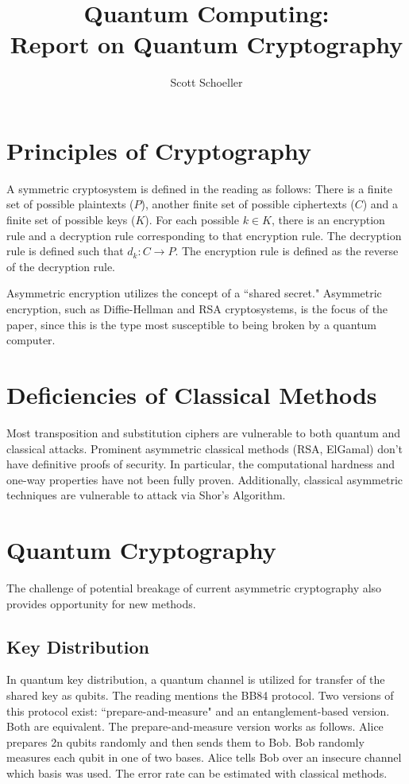 \documentclass[12pt]{article}
\title{Quantum Computing:\\Report on Quantum Cryptography}
\author{Scott Schoeller}
\date{}
\begin{document}
\maketitle

\begin{flushleft}
\newpage
{}
\section{Principles of Cryptography}
\par{A symmetric cryptosystem is defined in the reading \cite{dagmar_quantum_2007} as follows: There is a finite set of possible plaintexts ($P$), another finite set of possible ciphertexts ($C$) and a finite set of possible keys ($K$). For each possible $k \in K$, there is an encryption rule and a decryption rule corresponding to that encryption rule. The decryption rule is defined such that $d_k : C \to P$. The encryption rule is defined as the reverse of the decryption rule.}
\par{Asymmetric encryption utilizes the concept of a ``shared secret."  Asymmetric encryption, such as Diffie-Hellman and RSA cryptosystems, is the focus of the paper, since this is the type most susceptible to being broken by a quantum computer.}  
\section{Deficiencies of Classical Methods}
Most transposition and substitution ciphers are vulnerable to both quantum and classical attacks.
Prominent asymmetric classical methods (RSA, ElGamal) don't have definitive proofs of security. In particular, the computational hardness and one-way properties have not been fully proven. Additionally, classical asymmetric techniques are vulnerable to attack via Shor's Algorithm.

\section{Quantum Cryptography}
The challenge of potential breakage of current asymmetric cryptography also provides opportunity for new methods.
\subsection{Key Distribution}
 In quantum key distribution, a quantum channel is utilized for transfer of the shared key as qubits. The reading mentions the BB84 protocol. Two versions of this protocol exist: ``prepare-and-measure" and an entanglement-based version. Both are equivalent. The prepare-and-measure version works as follows. Alice prepares 2n qubits randomly and then sends them to Bob. Bob randomly measures each qubit in one of two bases. Alice tells Bob over an insecure channel which basis was used. The error rate can be estimated with classical methods.


\end{flushleft}
\end{document}
